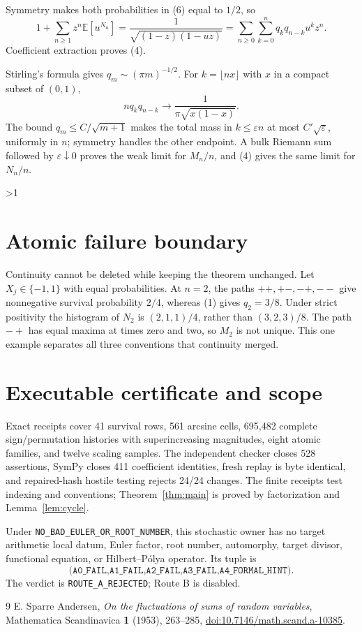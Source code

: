 \documentclass[10pt]{article}
\providecommand{\CRevisionRound}{2}
\newcommand{\Ee}{\mathbb E}
\begin{document}
Symmetry makes both probabilities in (6) equal to $1/2$, so
\begin{equation}
 1+\sum_{n\ge1}z^n\Ee[u^{N_n}]
 =\frac{1}{\sqrt{(1-z)(1-uz)}}
 =\sum_{n\ge0}\sum_{k=0}^n q_kq_{n-k}u^kz^n.             \tag{7}
\end{equation}
Coefficient extraction proves (4).

Stirling's formula gives $q_m\sim(\pi m)^{-1/2}$.  For
$k=\lfloor nx\rfloor$ with $x$ in a compact subset of $(0,1)$,
\[
 nq_kq_{n-k}\longrightarrow\frac{1}{\pi\sqrt{x(1-x)}}.
\]
The bound $q_m\le C/\sqrt{m+1}$ makes the total mass in
$k\le\varepsilon n$ at most $C'\sqrt\varepsilon$, uniformly in $n$; symmetry
handles the other endpoint.  A bulk Riemann sum followed by
$\varepsilon\downarrow0$ proves the weak limit for $M_n/n$, and (4) gives the
same limit for $N_n/n$.
\fi

\ifnum\CRevisionRound>1
\section{Atomic failure boundary}
Continuity cannot be deleted while keeping the theorem unchanged.  Let
$X_j\in\{-1,1\}$ with equal probabilities.  At $n=2$, the paths
$++,+-,-+,--$ give nonnegative survival probability $2/4$, whereas (1) gives
$q_2=3/8$.  Under strict positivity the histogram of $N_2$ is
$(2,1,1)/4$, rather than $(3,2,3)/8$.  The path $-+$ has equal maxima at times
zero and two, so $M_2$ is not unique.  This one example separates all three
conventions that continuity merged.

\section{Executable certificate and scope}
Exact receipts cover 41 survival rows, 561 arcsine cells, 695,482 complete
sign/permutation histories with superincreasing magnitudes, eight atomic
families, and twelve scaling samples.  The independent checker closes 528
assertions, SymPy closes 411 coefficient identities, fresh replay is byte
identical, and repaired-hash hostile testing rejects 24/24 changes.  The
finite receipts test indexing and conventions; Theorem~\ref{thm:main} is
proved by factorization and Lemma~\ref{lem:cycle}.

Under \texttt{NO\_BAD\_EULER\_OR\_ROOT\_NUMBER}, this stochastic owner has no
target arithmetic local datum, Euler factor, root number, automorphy, target
divisor, functional equation, or Hilbert--P\'olya operator.  Its tuple is
\[
\texttt{(A0\_FAIL,A1\_FAIL,A2\_FAIL,A3\_FAIL,A4\_FORMAL\_HINT)}.
\]
The verdict is \texttt{ROUTE\_A\_REJECTED}; Route B is disabled.
\fi

\begin{thebibliography}{9}
E. Sparre Andersen,
\emph{On the fluctuations of sums of random variables},
Mathematica Scandinavica \textbf{1} (1953), 263--285,
\href{https://doi.org/10.7146/math.scand.a-10385}
{doi:10.7146/math.scand.a-10385}.
\end{thebibliography}
\end{document}
